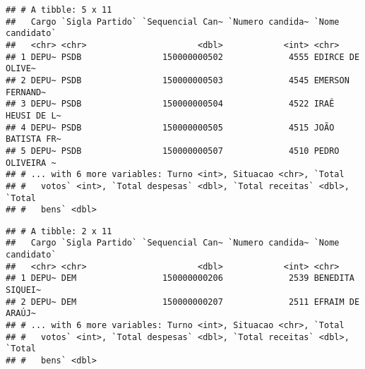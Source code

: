 \documentclass[]{article}
\newenvironment{Shaded}{\begin{snugshade}}{\end{snugshade}}
\newcommand{\KeywordTok}[1]{\textcolor[rgb]{0.13,0.29,0.53}{\textbf{#1}}}
\newcommand{\DataTypeTok}[1]{\textcolor[rgb]{0.13,0.29,0.53}{#1}}
\newcommand{\StringTok}[1]{\textcolor[rgb]{0.31,0.60,0.02}{#1}}
\newcommand{\OperatorTok}[1]{\textcolor[rgb]{0.81,0.36,0.00}{\textbf{#1}}}
\newcommand{\NormalTok}[1]{#1}
\begin{document}
\begin{verbatim}
## # A tibble: 5 x 11
##   Cargo `Sigla Partido` `Sequencial Can~ `Numero candida~ `Nome candidato`
##   <chr> <chr>                      <dbl>            <int> <chr>           
## 1 DEPU~ PSDB                150000000502             4555 EDIRCE DE OLIVE~
## 2 DEPU~ PSDB                150000000503             4545 EMERSON FERNAND~
## 3 DEPU~ PSDB                150000000504             4522 IRAÊ HEUSI DE L~
## 4 DEPU~ PSDB                150000000505             4515 JOÃO BATISTA FR~
## 5 DEPU~ PSDB                150000000507             4510 PEDRO OLIVEIRA ~
## # ... with 6 more variables: Turno <int>, Situacao <chr>, `Total
## #   votos` <int>, `Total despesas` <dbl>, `Total receitas` <dbl>, `Total
## #   bens` <dbl>
\end{verbatim}

\begin{Shaded}
\end{Shaded}

\begin{verbatim}
## # A tibble: 2 x 11
##   Cargo `Sigla Partido` `Sequencial Can~ `Numero candida~ `Nome candidato`
##   <chr> <chr>                      <dbl>            <int> <chr>           
## 1 DEPU~ DEM                 150000000206             2539 BENEDITA SIQUEI~
## 2 DEPU~ DEM                 150000000207             2511 EFRAIM DE ARAÚJ~
## # ... with 6 more variables: Turno <int>, Situacao <chr>, `Total
## #   votos` <int>, `Total despesas` <dbl>, `Total receitas` <dbl>, `Total
## #   bens` <dbl>
\end{verbatim}

\begin{Shaded}
\end{Shaded}
\end{document}
